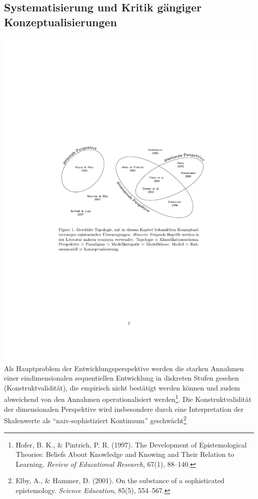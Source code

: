 \documentclass[]{tufte-handout}
\begin{document}
\subsection{Systematisierung und Kritik gängiger
Konzeptualisierungen}\label{systematisierung-und-kritik-gangiger-konzeptualisierungen}

\includegraphics{../Img/Topologie.pdf} Als Hauptproblem der
Entwicklungsperspektive werden die starken Annahmen einer
eindimensionalen sequentiellen Entwicklung in diskreten Stufen gesehen
(Konstruktvalidität), die empirisch nicht bestätigt werden können und
zudem abweichend von den Annahmen operationalisiert werden\footnote{Hofer,
  B. K., \& Pintrich, P. R. (1997). The Development of Epistemological
  Theories: Beliefs About Knowledge and Knowing and Their Relation to
  Learning. \emph{Review of Educational Research}, 67(1), 88--140.}. Die
Konstruktvalidität der dimensionalen Perspektive wird insbesondere durch
eine Interpretation der Skalenwerte als ``naiv-sophistiziert Kontinuum''
geschwächt\footnote{Elby, A., \& Hammer, D. (2001). On the substance of
  a sophisticated epistemology. \emph{Science Education}, 85(5),
  554--567.}
\end{document}

